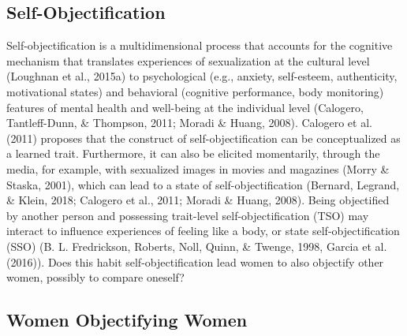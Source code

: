 \documentclass[
  man]{apa6}
\begin{document}
\subsection{Self-Objectification}\label{self-objectification}

Self-objectification is a multidimensional process that accounts for the
cognitive mechanism that translates experiences of sexualization at the
cultural level (Loughnan et al., 2015a) to psychological (e.g., anxiety,
self-esteem, authenticity, motivational states) and behavioral
(cognitive performance, body monitoring) features of mental health and
well-being at the individual level (Calogero, Tantleff-Dunn, \&
Thompson, 2011; Moradi \& Huang, 2008). Calogero et al. (2011) proposes
that the construct of self-objectification can be conceptualized as a
learned trait. Furthermore, it can also be elicited momentarily, through
the media, for example, with sexualized images in movies and magazines
(Morry \& Staska, 2001), which can lead to a state of
self-objectification (Bernard, Legrand, \& Klein, 2018; Calogero et al.,
2011; Moradi \& Huang, 2008). Being objectified by another person and
possessing trait-level self-objectification (TSO) may interact to
influence experiences of feeling like a body, or state
self-objectification (SSO) (B. L. Fredrickson, Roberts, Noll, Quinn, \&
Twenge, 1998, Garcia et al. (2016)). Does this habit
self-objectification lead women to also objectify other women, possibly
to compare oneself?

\subsection{Women Objectifying Women}\label{women-objectifying-women}
\end{document}
